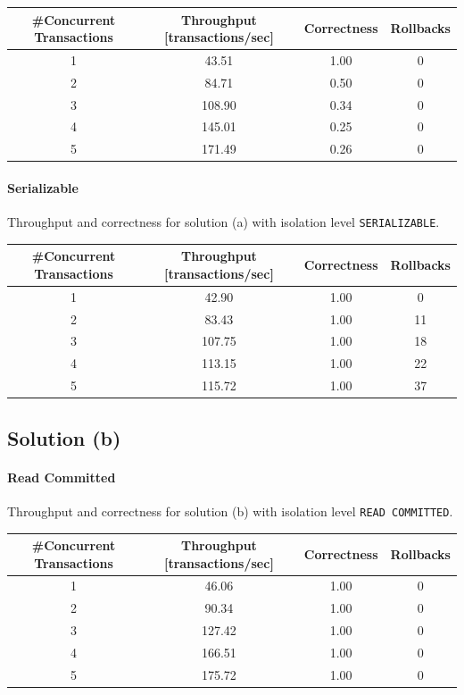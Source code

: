 \documentclass[11pt]{scrartcl}
\begin{document}
\begin{table}[H]
  \centering
  \begin{tabular}{c|c|c|c}
    \#Concurrent Transactions & Throughput [transactions/sec] & Correctness & Rollbacks
      \tabularnewline
    \hline
    1 & 43.51 & 1.00 & 0 \tabularnewline
    2 & 84.71 & 0.50 & 0 \tabularnewline
    3 & 108.90 & 0.34 & 0 \tabularnewline
    4 & 145.01 & 0.25 & 0 \tabularnewline
    5 & 171.49 & 0.26 & 0 \tabularnewline
  \end{tabular}
\end{table}

\paragraph{Serializable}

Throughput and correctness for solution (a) with isolation level \lstinline[style=dbtsql]{SERIALIZABLE}.

\begin{table}[H]
  \centering
  \begin{tabular}{c|c|c|c}
    \#Concurrent Transactions & Throughput [transactions/sec] & Correctness & Rollbacks
      \tabularnewline
    \hline
    1 & 42.90 & 1.00 & 0 \tabularnewline
    2 & 83.43 & 1.00 & 11 \tabularnewline
    3 & 107.75 & 1.00 & 18 \tabularnewline
    4 & 113.15 & 1.00 & 22 \tabularnewline
    5 & 115.72 & 1.00 & 37 \tabularnewline
  \end{tabular}
\end{table}

\subsection*{Solution (b)}

\paragraph{Read Committed}

Throughput and correctness for solution (b) with isolation level \lstinline[style=dbtsql]{READ COMMITTED}.

\begin{table}[H]
  \centering
  \begin{tabular}{c|c|c|c}
    \#Concurrent Transactions & Throughput [transactions/sec] & Correctness & Rollbacks
      \tabularnewline
    \hline
    1 & 46.06 & 1.00 & 0 \tabularnewline
    2 & 90.34 & 1.00 & 0 \tabularnewline
    3 & 127.42 & 1.00 & 0 \tabularnewline
    4 & 166.51 & 1.00 & 0 \tabularnewline
    5 & 175.72 & 1.00 & 0 \tabularnewline
  \end{tabular}
\end{table}
\end{document}
